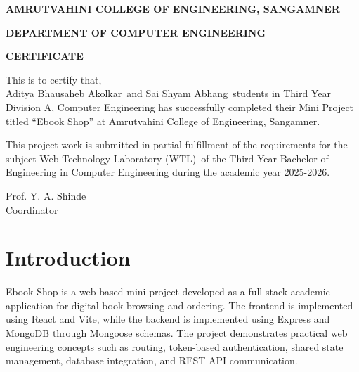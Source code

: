 \documentclass[12pt,a4paper]{report}
\newcommand{\ProjectTitle}{Ebook Shop}
\newcommand{\StudentOneName}{Aditya Bhausaheb Akolkar}
\newcommand{\StudentTwoName}{Sai Shyam Abhang}
\newcommand{\GuideName}{Prof. Y. A. Shinde}
\newcommand{\AcademicYear}{2025-2026}
\newcommand{\CourseName}{Web Technology Laboratory (WTL)}
\begin{document}
\clearpage
\thispagestyle{empty}

\begin{center}
    {\large\bfseries AMRUTVAHINI COLLEGE OF ENGINEERING, SANGAMNER \par}
    {\large\bfseries DEPARTMENT OF COMPUTER ENGINEERING \par}
    \vspace{0.9cm}
    {\Large\bfseries CERTIFICATE \par}
\end{center}

\vspace{0.9cm}

\noindent
This is to certify that,\\[0.4cm]
\StudentOneName\ and \StudentTwoName\ students in Third Year Division A, Computer Engineering has successfully completed their Mini Project titled ``\ProjectTitle'' at Amrutvahini College of Engineering, Sangamner.

\vspace{0.4cm}

\noindent
This project work is submitted in partial fulfillment of the requirements for the subject \CourseName\ of the Third Year Bachelor of Engineering in Computer Engineering during the academic year \AcademicYear.

\vspace{2.5cm}

\begin{flushright}
\GuideName\\
Coordinator
\end{flushright}

\clearpage
\thispagestyle{empty}
\tableofcontents
\clearpage

\setcounter{page}{1}

\chapter{Introduction}
Ebook Shop is a web-based mini project developed as a full-stack academic application for digital book browsing and ordering. The frontend is implemented using React and Vite, while the backend is implemented using Express and MongoDB through Mongoose schemas. The project demonstrates practical web engineering concepts such as routing, token-based authentication, shared state management, database integration, and REST API communication.
\end{document}

